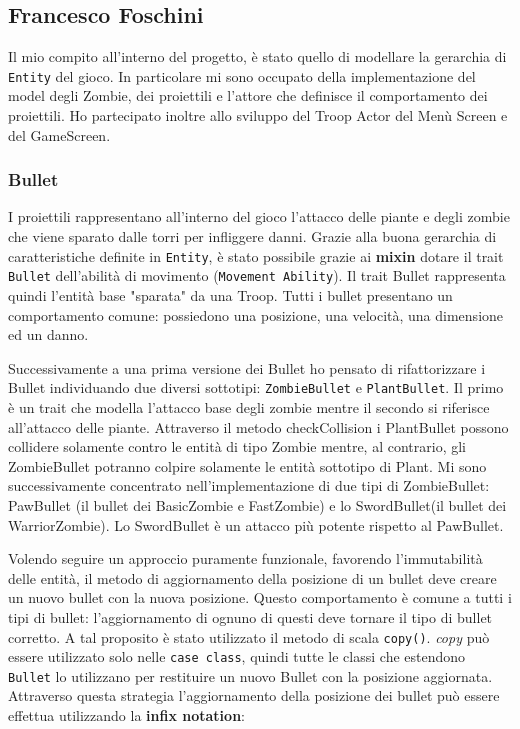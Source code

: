 


\subsection{Francesco Foschini}
Il mio compito all'interno del progetto, è stato quello di modellare la gerarchia di \texttt{Entity} del gioco.
In particolare mi sono occupato della implementazione del model degli Zombie, dei proiettili e l'attore che definisce il comportamento dei proiettili.
Ho partecipato inoltre allo sviluppo del Troop Actor del Menù Screen e del GameScreen.

\subsubsection{Bullet}
I proiettili rappresentano all'interno del gioco l'attacco delle piante e degli zombie che viene sparato dalle torri
per infliggere danni. Grazie alla buona gerarchia di caratteristiche definite in \texttt{Entity}, è stato possibile grazie  ai \textbf{mixin}
dotare il trait \texttt{Bullet} dell'abilità di movimento (\texttt{Movement Ability}).
Il trait Bullet rappresenta quindi l'entità base "sparata" da una Troop.
Tutti i bullet presentano un comportamento comune: possiedono una posizione, una velocità, una dimensione ed un danno.


Successivamente a una prima versione dei Bullet ho pensato di rifattorizzare i Bullet individuando due diversi sottotipi: \texttt{ZombieBullet} e \texttt{PlantBullet}.
Il primo è un trait che modella l'attacco base degli zombie mentre il secondo si riferisce all'attacco delle piante.
Attraverso il metodo checkCollision i PlantBullet possono collidere solamente contro le entità di tipo Zombie mentre,
al contrario, gli ZombieBullet potranno colpire solamente le entità sottotipo di Plant.
Mi sono successivamente concentrato nell'implementazione di due tipi di ZombieBullet: PawBullet (il bullet dei
BasicZombie e FastZombie) e lo SwordBullet(il bullet dei WarriorZombie).
Lo SwordBullet è un attacco più potente rispetto al PawBullet.

Volendo seguire un approccio puramente funzionale, favorendo l'immutabilità delle entità, il metodo di
aggiornamento della posizione di un bullet deve creare un nuovo bullet con la nuova posizione.
Questo comportamento è comune a tutti i tipi di bullet: l'aggiornamento di ognuno di questi deve
tornare il tipo di bullet corretto. A tal proposito è stato utilizzato il metodo di scala  \texttt{copy()}.
\textit{copy} può essere utilizzato solo nelle \texttt{case class}, quindi tutte le classi che estendono
\texttt{Bullet} lo utilizzano per restituire un nuovo Bullet con la posizione aggiornata.
Attraverso questa strategia l'aggiornamento della posizione dei bullet può essere effettua utilizzando la \textbf{infix notation}:

